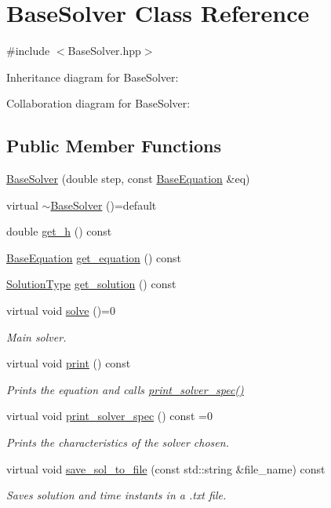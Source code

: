 \hypertarget{classBaseSolver}{}\section{Base\+Solver Class Reference}
\label{classBaseSolver}


{\ttfamily \#include $<$Base\+Solver.\+hpp$>$}



Inheritance diagram for Base\+Solver\+:


Collaboration diagram for Base\+Solver\+:
\subsection*{Public Member Functions}
\begin{DoxyCompactItemize}
\item 
\hyperlink{classBaseSolver_a67dba5908628ed3dd89735d9e4c4a436}{Base\+Solver} (double step, const \hyperlink{classBaseEquation}{Base\+Equation} \&eq)
\item 
virtual \hyperlink{classBaseSolver_aeda8cb9b2995ef1720d0e48abfa645d1}{$\sim$\+Base\+Solver} ()=default
\item 
double \hyperlink{classBaseSolver_a4f4ada66347913e8ac7d6c11d2c87b2c}{get\+\_\+h} () const
\item 
\hyperlink{classBaseEquation}{Base\+Equation} \hyperlink{classBaseSolver_ad23f3587017d0fdcca0620440a2d2ef6}{get\+\_\+equation} () const
\item 
\hyperlink{utils_8hpp_a400268d86a9a9e939d9cce230bafc868}{Solution\+Type} \hyperlink{classBaseSolver_a6c867079cffc2aaa2af28425b4ea9d40}{get\+\_\+solution} () const
\item 
virtual void \hyperlink{classBaseSolver_a57f3b4ddec8693c61917aa37a2bac660}{solve} ()=0
\begin{DoxyCompactList}\small\item\em Main solver. \end{DoxyCompactList}\item 
virtual void \hyperlink{classBaseSolver_a8dd30ba31c4fe6268f1bc779b3b1c8fa}{print} () const
\begin{DoxyCompactList}\small\item\em Prints the equation and calls \hyperlink{classBaseSolver_a44725e315b208c0ee69ba8fd5d172e09}{print\+\_\+solver\+\_\+spec()} \end{DoxyCompactList}\item 
virtual void \hyperlink{classBaseSolver_a44725e315b208c0ee69ba8fd5d172e09}{print\+\_\+solver\+\_\+spec} () const =0
\begin{DoxyCompactList}\small\item\em Prints the characteristics of the solver chosen. \end{DoxyCompactList}\item 
virtual void \hyperlink{classBaseSolver_a083167190cdd436c2a5aa60cbb58d904}{save\+\_\+sol\+\_\+to\+\_\+file} (const std\+::string \&file\+\_\+name) const
\begin{DoxyCompactList}\small\item\em Saves solution and time instants in a .txt file. \end{DoxyCompactList}\end{DoxyCompactItemize}
